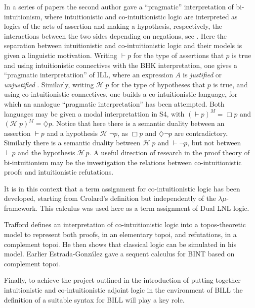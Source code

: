 \documentclass{lmcs}
\begin{document}
In a series of papers the second author gave a ``pragmatic''
interpretation of bi-intuitionism, where intuitionistic and
co-intuitionistic logic are interpreted as logics of the acts of
assertion and making a hypothesis, respectively, the interactions
between the two sides depending on negations, see \cite{Bellin:2014}.
Here the separation between intuitionistic and co-intuitionistic logic
and their models is given a linguistic motivation. Writing $\vdash p$
for the type of assertions that $p$ is true and using intuitionistic
connectives with the BHK interpretation, one gives a ``pragmatic
interpretatiion'' of ILL, where an expression $A$ is \emph{justified}
or \emph{unjustified} \cite{dalla1995pragmatic}. Similarly, writing
$\mathcal{H}\; p$ for the type of hypotheses that $p$ is true, and
using co-intuitionistic connectives, one builds a co-intuitionistic
language, for which an analogue ``pragmatic interpretation'' has been
attempted.  Both languages may be given a modal interpretattion in S4,
with $(\vdash p)^M = \Box p$ and $(\mathcal{H}\; p)^M = \diamondsuit
p$. Notice that here there is a semantic duality between an assertion
$\vdash p$ and a hypothesis $\mathcal{H}\; \neg p$, as $\Box p$ and
$\diamondsuit \neg p$ are contradictory. Similarly there is a semantic
duality between $\mathcal{H}\; p$ and $\vdash \neg p$, but not between
$\vdash p$ and the hypothesis $\mathcal{H}\, p$. A useful direction of
research in the proof theory of bi-intuitionism may be the
investigation the relations between co-intuitionistic proofs and
intuitionistic refutations.

It is in this context that a term assignment for co-intuitionistic  logic 
has been developed, starting from Crolard's definition but independently
of the $\lambda\mu$-framework. This calculus was used
here as a term assignment of Dual LNL logic.

Trafford \cite{trafford2016structuring} defines an interpretation of
co-intuitionistic logic into a topos-theoretic model to represent both
proofs, in an elementary topoi, and refutations, in a complement
topoi.  He then shows that classical logic can be simulated in his
model.  Earlier Estrada-Gonz\'alez \cite{estrada2010complement} gave a
sequent calculus for BINT based on complement topoi.

Finally, to achieve the project outlined in the introduction of putting
together intuitionistic and co-intuitionistic adjoint logic in the
environment of BILL the definition of a suitable syntax for BILL will
play a key role.
\end{document}
